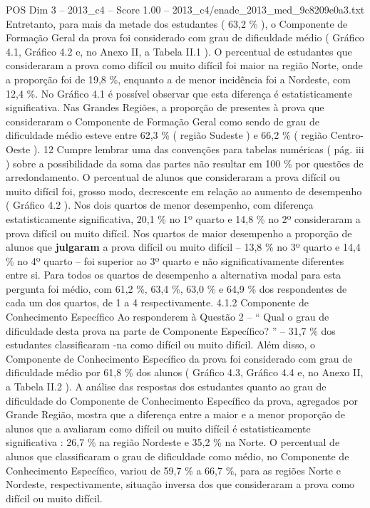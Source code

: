 \begin{textsample}{POS Dim 3 – 2013\_c4 – Score 1.00 – 2013\_c4/enade\_2013\_med\_9c8209e0a3.txt}
Entretanto, para mais da metade dos estudantes ( 63,2 \% ), o Componente de Formação Geral da prova foi considerado com grau de dificuldade médio ( Gráfico 4.1, Gráfico 4.2 e, no Anexo II, a Tabela II.1 ).
O percentual de estudantes que consideraram a prova como difícil ou muito difícil foi maior na região Norte, onde a proporção foi de 19,8 \%, enquanto a de menor incidência foi a Nordeste, com 12,4 \%.
No Gráfico 4.1 é possível observar que esta diferença é estatisticamente significativa.
Nas Grandes Regiões, a proporção de presentes à prova que consideraram o Componente de Formação Geral como sendo de grau de dificuldade médio esteve entre 62,3 \% ( região Sudeste ) e 66,2 \% ( região Centro-Oeste ). 12 Cumpre lembrar uma das convenções para tabelas numéricas ( pág. iii ) sobre a possibilidade da soma das partes não resultar em 100 \% por questões de arredondamento.
O percentual de alunos que consideraram a prova difícil ou muito difícil foi, grosso modo, decrescente em relação ao aumento de desempenho ( Gráfico 4.2 ).
Nos dois quartos de menor desempenho, com diferença estatisticamente significativa, 20,1 \% no 1º quarto e 14,8 \% no 2º consideraram a prova difícil ou muito difícil.
Nos quartos de maior desempenho a proporção de alunos que \textbf{julgaram} a prova difícil ou muito difícil – 13,8 \% no 3º quarto e 14,4 \% no 4º quarto – foi superior ao 3º quarto e não significativamente diferentes entre si.
Para todos os quartos de desempenho a alternativa modal para esta pergunta foi médio, com 61,2 \%, 63,4 \%, 63,0 \% e 64,9 \% dos respondentes de cada um dos quartos, de 1 a 4 respectivamente. 4.1.2 Componente de Conhecimento Específico Ao responderem à Questão 2 – “ Qual o grau de dificuldade desta prova na parte de Componente Específico? ” – 31,7 \% dos estudantes classificaram -na como difícil ou muito difícil.
Além disso, o Componente de Conhecimento Específico da prova foi considerado com grau de dificuldade médio por 61,8 \% dos alunos ( Gráfico 4.3, Gráfico 4.4 e, no Anexo II, a Tabela II.2 ).
A análise das respostas dos estudantes quanto ao grau de dificuldade do Componente de Conhecimento Específico da prova, agregados por Grande Região, mostra que a diferença entre a maior e a menor proporção de alunos que a avaliaram como difícil ou muito difícil é estatisticamente significativa : 26,7 \% na região Nordeste e 35,2 \% na Norte.
O percentual de alunos que classificaram o grau de dificuldade como médio, no Componente de Conhecimento Específico, variou de 59,7 \% a 66,7 \%, para as regiões Norte e Nordeste, respectivamente, situação inversa dos que consideraram a prova como difícil ou muito difícil.

\end{textsample}

